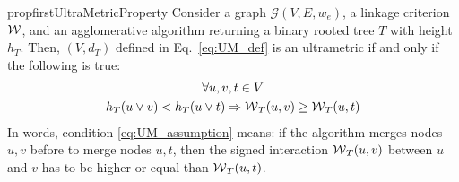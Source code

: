 \begin{restatable}{prop}{firstUltraMetricProperty}
\label{prop:ultraMetric1}
Consider a graph $\mathcal{G}(V,E,w_e)$, a linkage criterion $\mathcal{W}{}$, and an agglomerative algorithm returning a binary rooted tree $T$ with height $h_T$. Then, $(V, d_{T})$ defined in Eq.~\ref{eq:UM_def} is an ultrametric if and only if the following is true:
\begin{gather}
\forall u,v,t \in V \nonumber \\
 h_T(u \vee v) < h_T(u \vee t) \Rightarrow \mathcal{W}{}_{T}(u,v) \geq \mathcal{W}{}_{T}(u,t) \label{eq:UM_assumption}
\end{gather}
In words, condition \ref{eq:UM_assumption} means: if the algorithm merges nodes $u,v$ before to merge nodes $u,t$, then the signed interaction $\mathcal{W}{}_{T}(u,v)$ between $u$ and $v$ has to be higher or equal than $\mathcal{W}{}_{T}(u,t)$.
\end{restatable}
